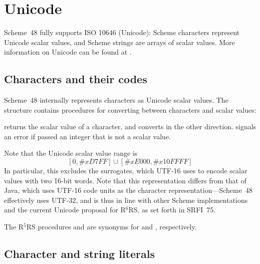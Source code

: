 

\chapter{Unicode}

Scheme~48 fully supports ISO 10646 (Unicode): Scheme characters
represent Unicode scalar values, and Scheme strings are arrays of
scalar values.  More information on Unicode can be found at
.

\section{Characters and their codes}

Scheme~48 internally represents characters as Unicode scalar values.
The  structure contains procedures for converting
between characters and scalar values:
%
\begin{protos}
\end{protos}
%
 returns the scalar value of a character, and
 converts in the other direction.
 signals an error if passed an integer that is
not a scalar value.

Note that the Unicode scalar value range is
%
\begin{displaymath}
\left[0,\#x\mathit{D7FF}\right] \cup \left[\#x\mathit{E000}, \#x\mathit{10FFFF}\right]
\end{displaymath}
%
In particular, this excludes the surrogates, which UTF-16 uses to
encode scalar values with two 16-bit words.  Note that this
representation differs from that of Java, which uses UTF-16 code units
as the character representation---Scheme~48 effectively uses UTF-32,
and is thus in line with other Scheme implementations and the current
Unicode proposal for R$^6$RS, as set forth in SRFI~75.

The R$^5$RS procedures  and 
are synonyms for  and
, respectively.

\section{Character and string literals}

